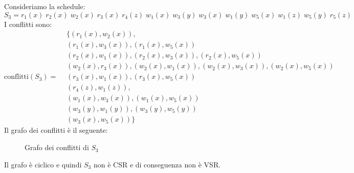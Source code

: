 \documentclass[a4paper]{article}
\begin{document}
\begin{Example}{}{}
Consideriamo la schedule:
\[
  S_3 = r_1(x) \; r_2(x) \; w_2(x) \; r_3(x) \; r_4(z) \; w_1(x) \; w_3(y) \; w_3(x) \; w_1(y) \;
  w_5(x) \; w_1(z) \; w_5(y) \; r_5(z)
\]
I conflitti sono:
\[
  \text{conflitti}(S_3) = \begin{aligned}
    & \{ (r_1(x), w_2(x)),\\
    &(r_1(x), w_3(x)), (r_1(x), w_5(x))\\
    &(r_2(x), w_1(x)), (r_2(x), w_3(x)), (r_2(x), w_5(x))\\
    &(w_2(x), r_3(x)), (w_2(x), w_1(x)), (w_2(x), w_3(x)), (w_2(x), w_5(x))\\
    &(r_3(x), w_1(x)), (r_3(x), w_5(x))\\
    &(r_4(z), w_1(z)),\\
    &(w_1(x), w_3(x)), (w_1(x), w_5(x))\\
    &(w_3(y), w_1(y)), (w_3(y), w_5(y))\\
    &(w_3(x), w_5(x)) \}
  \end{aligned}
\]
Il grafo dei conflitti è il seguente:
\begin{figure}[H]
  \centering
  \caption{Grafo dei conflitti di \( S_3 \)}
\end{figure}
\noindent
Il grafo è ciclico e quindi $S_3$ non è CSR e di conseguenza non è VSR.
\end{Example}
\end{document}

